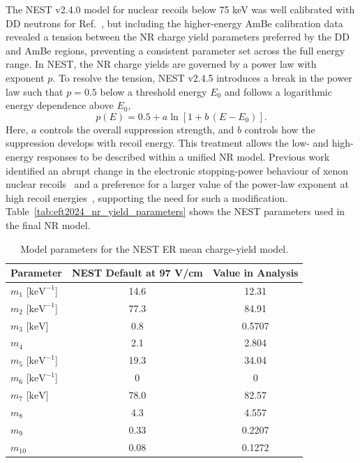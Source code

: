 The NEST v2.4.0 model for nuclear recoils below 75 keV was well calibrated with DD neutrons for Ref.~\cite{LZ:2025lowmass}, but including the higher-energy AmBe calibration data revealed a tension between the NR charge yield parameters preferred by the DD and AmBe regions, preventing a consistent parameter set across the full energy range. In NEST, the NR charge yields are governed by a power law with exponent $p$. To resolve the tension, NEST v2.4.5 introduces a break in the power law such that  $p=0.5$ below a threshold energy $E_0$ and follows a logarithmic energy dependence above $E_0$, 
\begin{equation}
    p(E)=0.5 + a \ln\!\left[1 + b\,(E - E_0)\right].
\end{equation}
Here, $a$ controls the overall suppression strength, and $b$ controls how the suppression develops with recoil energy.
This treatment allows the low- and high-energy responses to be described within a unified NR model.
Previous work identified an abrupt change in the electronic stopping-power behaviour of xenon nuclear recoils~\cite{Aprile:2006} and a preference for a larger value of the power-law exponent at high recoil energies~\cite{Lenardo:2015}, supporting the need for such a modification. Table~\ref{tab:eft2024_nr_yield_parameters} shows the NEST parameters used in the final NR model. 

\begin{table}[ht]
    \centering
    \caption{
       Model parameters for the NEST ER mean
        charge-yield model.
    }
    \begin{tabular}{lcc}
        \hline\hline
        Parameter & {NEST Default at 97 V/cm} & {Value in Analysis} \\
        \hline
        $m_{1}$ [$\mathrm{keV}^{-1}$] & 14.6 & 12.31 \\
        $m_{2}$ [$\mathrm{keV}^{-1}$] & 77.3 & 84.91 \\
        $m_{3}$ [$\mathrm{keV}$]      & 0.8  & 0.5707 \\
        $m_{4}$                       & 2.1  & 2.804 \\
        $m_{5}$ [$\mathrm{keV}^{-1}$] & 19.3 & 34.04 \\
        $m_{6}$ [$\mathrm{keV}^{-1}$] & 0    & 0 \\
        $m_{7}$ [$\mathrm{keV}$]      & 78.0 & 82.57 \\
        $m_{8}$                       & 4.3  & 4.557 \\
        $m_{9}$                       & 0.33 & 0.2207 \\
        $m_{10}$                      & 0.08 & 0.1272 \\
        \hline\hline
    \end{tabular}
    \label{tab:eft2024_er_mean_yield}
\end{table}

